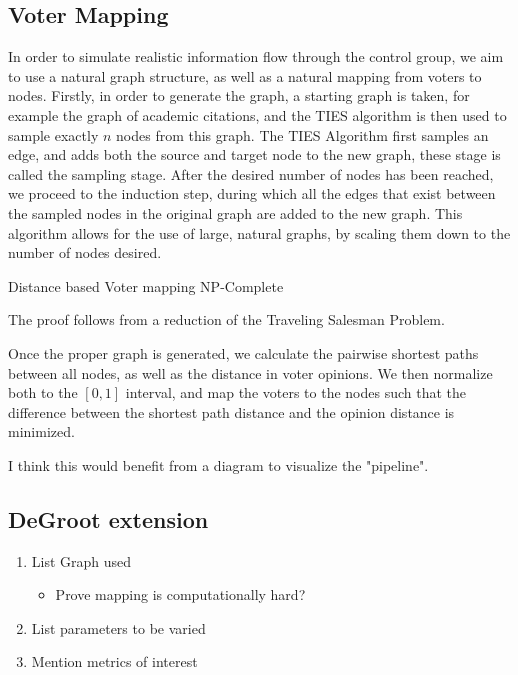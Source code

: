 \subsection{Voter Mapping}
In order to simulate realistic information flow through the control group, we aim to use a natural graph structure, as well as a natural mapping from voters to nodes. Firstly, in order to generate the graph, a starting graph is taken, for example the graph of academic citations, and the TIES \cite{ahmedNetworkSamplingStatic2013} algorithm is then used to sample exactly $n$ nodes from this graph. The TIES Algorithm first samples an edge, and adds both the source and target node to the new graph, these stage is called the sampling stage. After the desired number of nodes has been reached, we proceed to the induction step, during which all the edges that exist between the sampled nodes in the original graph are added to the new graph. This algorithm allows for the use of large, natural graphs, by scaling them down to the number of nodes desired.

\begin{theorem}{}
	Distance based Voter mapping NP-Complete
\end{theorem}

\begin{proofc}{}
	The proof follows from a reduction of the Traveling Salesman Problem. 
\end{proofc}

Once the proper graph is generated, we calculate the pairwise shortest paths between all nodes, as well as the distance in voter opinions. We then normalize both to the $[0,1]$ interval, and map the voters to the nodes such that the difference between the shortest path distance and the opinion distance is minimized.

\textcolor{Bittersweet}{I think this would benefit from a diagram to visualize the "pipeline"}.

\subsection{DeGroot extension}
\begin{enumerate}
	\item List Graph used
		\begin{itemize}
			\item Prove mapping is computationally hard?
		\end{itemize}
	\item List parameters to be varied
	\item Mention metrics of interest

\end{enumerate}
